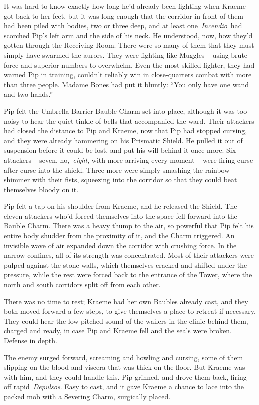 It was hard to know exactly how long he'd already been fighting when
Kraeme got back to her feet, but it was long enough that the corridor in
front of them had been piled with bodies, two or three deep, and at
least one~\emph{Incendio}~had scorched Pip's left arm and the side of
his neck. He understood, now, how they'd gotten through the Receiving
Room. There were so many of them that they must simply have swarmed the
aurors. They were fighting like Muggles -- using brute force and
superior numbers to overwhelm. Even the most skilled fighter, they had
warned Pip in training, couldn't reliably win in close-quarters combat
with more than three people. Madame Bones had put it bluntly: ``You only
have one wand and two hands.''

Pip felt the Umbrella Barrier Bauble Charm set into place, although it
was too noisy to hear the quiet tinkle of bells that accompanied the
ward. Their attackers had closed the distance to Pip and Kraeme, now
that Pip had stopped cursing, and they were already hammering on his
Prismatic Shield. He pulled it out of suspension before it could be
lost, and put his will behind it once more. Six attackers -- seven,
no,~\emph{eight}, with more arriving every moment -- were firing curse
after curse into the shield. Three more were simply smashing the rainbow
shimmer with their fists, squeezing into the corridor so that they could
beat themselves bloody on it.

Pip felt a tap on his shoulder from Kraeme, and he released the Shield.
The eleven attackers who'd forced themselves into the space fell forward
into the Bauble Charm. There was a heavy thump to the air, so powerful
that Pip felt his entire body shudder from the proximity of it, and the
Charm triggered. An invisible wave of air expanded down the corridor
with crushing force. In the narrow confines, all of its strength was
concentrated. Most of their attackers were pulped against the stone
walls, which themselves cracked and shifted under the pressure, while
the rest were forced back to the entrance of the Tower, where the north
and south corridors split off from each other.

There was no time to rest; Kraeme had her own Baubles already cast, and
they both moved forward a few steps, to give themselves a place to
retreat if necessary. They could hear the low-pitched sound of the
wailers in the clinic behind them, charged and ready, in case Pip and
Kraeme fell and the seals were broken. Defense in depth.

The enemy surged forward, screaming and howling and cursing, some of
them slipping on the blood and viscera that was thick on the floor. But
Kraeme was with him, and they could handle this. Pip grinned, and drove
them back, firing off rapid~\emph{Depulsos}. Easy to cast, and it gave
Kraeme a chance to lace into the packed mob with a Severing Charm,
surgically placed.

